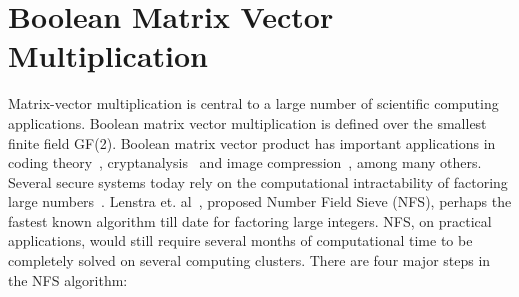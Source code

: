 \documentclass[conference, 9pt]{IEEEtran}
\begin{document}
\section{Boolean Matrix Vector Multiplication}
Matrix-vector multiplication is central to a large number of scientific computing applications.
Boolean matrix vector multiplication is defined over the smallest finite field GF(2). 
Boolean matrix vector product has important applications in coding theory~\cite{1216697},
cryptanalysis~\cite{lenstra1990number} and image compression~\cite{swanson1996binary}, among many
others. Several secure systems today rely on the computational intractability of factoring large
numbers~\cite{wiener1990cryptanalysis}. Lenstra et. al~\cite{lenstra1990number}, proposed Number
Field Sieve (NFS), perhaps the fastest known algorithm till date for factoring large integers. NFS,
on practical applications, would still require several months of computational time to be completely
solved on several computing clusters. There are four major steps in the NFS algorithm:
\end{document}
